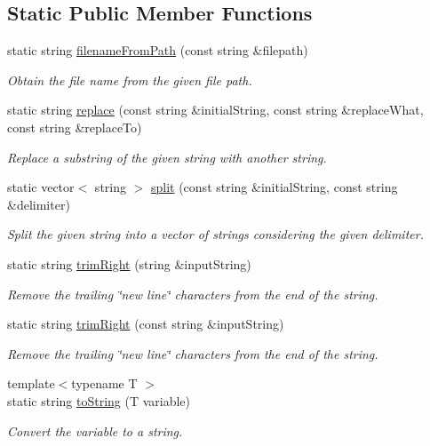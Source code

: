 \subsection*{Static Public Member Functions}
\begin{DoxyCompactItemize}
\item 
static string \hyperlink{classmultiscale_1_1StringManipulator_ab0354ab5ca48df4394695445fe105640}{filename\-From\-Path} (const string \&filepath)
\begin{DoxyCompactList}\small\item\em Obtain the file name from the given file path. \end{DoxyCompactList}\item 
static string \hyperlink{classmultiscale_1_1StringManipulator_afe65f4f4cdf70976df2a8749b9e2fc7b}{replace} (const string \&initial\-String, const string \&replace\-What, const string \&replace\-To)
\begin{DoxyCompactList}\small\item\em Replace a substring of the given string with another string. \end{DoxyCompactList}\item 
static vector$<$ string $>$ \hyperlink{classmultiscale_1_1StringManipulator_a899c72a05bbd8fb525f31bca3c1ec3c4}{split} (const string \&initial\-String, const string \&delimiter)
\begin{DoxyCompactList}\small\item\em Split the given string into a vector of strings considering the given delimiter. \end{DoxyCompactList}\item 
static string \hyperlink{classmultiscale_1_1StringManipulator_a1c1fb34b90f9283b2c1c1a4caeba33f6}{trim\-Right} (string \&input\-String)
\begin{DoxyCompactList}\small\item\em Remove the trailing \char`\"{}new line\char`\"{} characters from the end of the string. \end{DoxyCompactList}\item 
static string \hyperlink{classmultiscale_1_1StringManipulator_ad8ee19aa9b53fdc13e10ce2913d8e7f4}{trim\-Right} (const string \&input\-String)
\begin{DoxyCompactList}\small\item\em Remove the trailing \char`\"{}new line\char`\"{} characters from the end of the string. \end{DoxyCompactList}\item 
{\footnotesize template$<$typename T $>$ }\\static string \hyperlink{classmultiscale_1_1StringManipulator_a91858c4faa5ee210a9b67e4885835368}{to\-String} (T variable)
\begin{DoxyCompactList}\small\item\em Convert the variable to a string. \end{DoxyCompactList}\end{DoxyCompactItemize}

